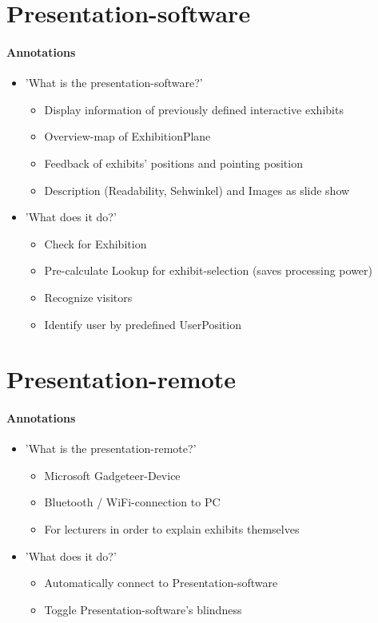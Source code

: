 \section{Presentation-software}
\label{implementation_presentation}

\paragraph{Annotations}

\begin{itemize}
	\item 'What is the presentation-software?'
	\begin{itemize}
		\item Display information of previously defined interactive exhibits
		\item Overview-map of ExhibitionPlane
		\item Feedback of exhibits' positions and pointing position
		\item Description (Readability, Sehwinkel) and Images as slide show
	\end{itemize}
	\item 'What does it do?'
	\begin{itemize}
		\item Check for Exhibition
		\item Pre-calculate Lookup for exhibit-selection (saves processing power)
		\item Recognize visitors
		\item Identify user by predefined UserPosition 
	\end{itemize}
\end{itemize}



\section{Presentation-remote}
\label{implementation_remote}

\paragraph{Annotations}

\begin{itemize}
	\item 'What is the presentation-remote?'
	\begin{itemize}
		\item Microsoft Gadgeteer-Device
		\item Bluetooth / WiFi-connection to PC
		\item For lecturers in order to explain exhibits themselves
	\end{itemize}
	\item 'What does it do?'
	\begin{itemize}
		\item Automatically connect to Presentation-software
		\item Toggle Presentation-software's blindness
	\end{itemize}
\end{itemize}



